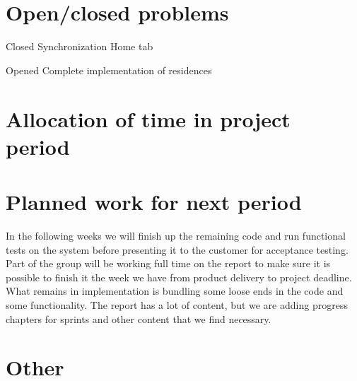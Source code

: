\documentclass[12pt]{article}
\begin{document}
\section{Open/closed problems}
Closed
Synchronization
Home tab

Opened
Complete implementation of residences


\section{Allocation of time in project period}

\section{Planned work for next period}
In the following weeks we will finish up the remaining code and run functional tests on the system before presenting it to the customer for acceptance testing. Part of the group will be working full time on the report to make sure it is possible to finish it the week we have from product delivery to project deadline. What remains in implementation is bundling some loose ends in the code and some functionality. The report has a lot of content, but we are adding progress chapters for sprints and other content that we find necessary. 

\section{Other}
\end{document}
